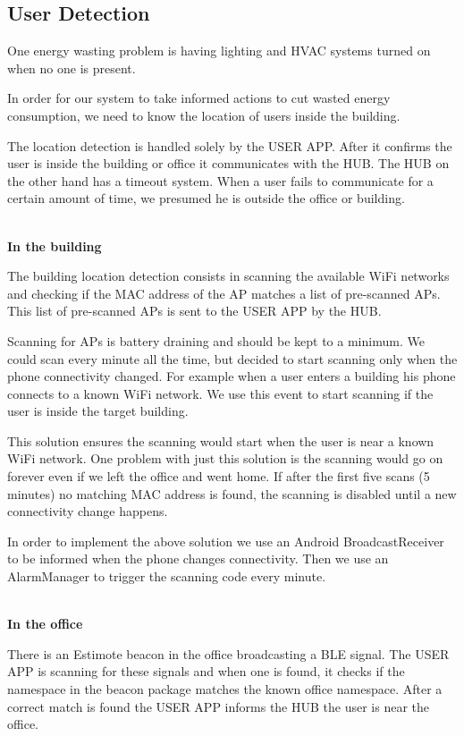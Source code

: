 \subsection{User Detection}\label{user_detection_imp}

One energy wasting problem is having lighting and \ac{HVAC} systems turned on when no one is present.


In order for our system to take informed actions to cut wasted energy consumption, we need to know the location of users inside the building.


The location detection is handled solely by the USER APP. After it confirms the user is inside the building or office it communicates with the HUB. The HUB on the other hand has a timeout system. When a user fails to communicate for a certain amount of time, we presumed he is outside the office or building.

\mbox{}\\
\textbf{In the building}

The building location detection consists in scanning the available \ac{WiFi} networks and checking if the \ac{MAC address} of the \ac{AP} matches a list of pre-scanned \ac{AP}s. This list of pre-scanned \ac{AP}s is sent to the USER APP by the HUB.  

Scanning for \ac{AP}s is battery draining and should be kept to a minimum. We could scan every minute all the time, but decided to start scanning only when the phone connectivity changed. For example when a user enters a building his phone connects to a known \ac{WiFi} network. We use this event to start scanning if the user is inside the target building.


This solution ensures the scanning would start when the user is near a known \ac{WiFi} network. One problem with just this solution is the scanning would go on forever even if we left the office and went home. If after the first five scans (5 minutes) no matching \ac{MAC address} is found, the scanning is disabled until a new connectivity change happens. 


In order to implement the above solution we use an Android BroadcastReceiver to be informed when the phone changes connectivity. Then we use an AlarmManager to trigger the scanning code every minute.

\mbox{}\\
\textbf{In the office}

There is an Estimote beacon in the office broadcasting a \ac{BLE} signal. The USER APP is scanning for these signals and when one is found, it checks if the namespace in the beacon package matches the known office namespace. After a correct match is found the USER APP informs the HUB the user is near the office.

